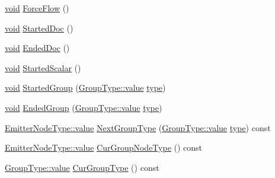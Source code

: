 \begin{DoxyCompactItemize}
\item 
\mbox{\hyperlink{glad_8h_a950fc91edb4504f62f1c577bf4727c29}{void}} \mbox{\hyperlink{class_y_a_m_l_1_1_emitter_state_ab37f1803adfbc4dc15fab899fdf5f982}{Force\+Flow}} ()
\item 
\mbox{\hyperlink{glad_8h_a950fc91edb4504f62f1c577bf4727c29}{void}} \mbox{\hyperlink{class_y_a_m_l_1_1_emitter_state_a3857bc4592ab42c96399a6a02586efbb}{Started\+Doc}} ()
\item 
\mbox{\hyperlink{glad_8h_a950fc91edb4504f62f1c577bf4727c29}{void}} \mbox{\hyperlink{class_y_a_m_l_1_1_emitter_state_a9ceddaddfdec22c12efab293248746cd}{Ended\+Doc}} ()
\item 
\mbox{\hyperlink{glad_8h_a950fc91edb4504f62f1c577bf4727c29}{void}} \mbox{\hyperlink{class_y_a_m_l_1_1_emitter_state_ace1874d4251a739c99f34ff7e0d133cc}{Started\+Scalar}} ()
\item 
\mbox{\hyperlink{glad_8h_a950fc91edb4504f62f1c577bf4727c29}{void}} \mbox{\hyperlink{class_y_a_m_l_1_1_emitter_state_a8856f8e15252abc2b1729eaccedf71cf}{Started\+Group}} (\mbox{\hyperlink{struct_y_a_m_l_1_1_group_type_aab9271cd8999a6694cb10670e6a5496f}{Group\+Type\+::value}} \mbox{\hyperlink{glad_8h_a890efa53b3d7deeeced6f3a0d6653ed3}{type}})
\item 
\mbox{\hyperlink{glad_8h_a950fc91edb4504f62f1c577bf4727c29}{void}} \mbox{\hyperlink{class_y_a_m_l_1_1_emitter_state_a9f5d053e4f87cf8633e03863b34443c9}{Ended\+Group}} (\mbox{\hyperlink{struct_y_a_m_l_1_1_group_type_aab9271cd8999a6694cb10670e6a5496f}{Group\+Type\+::value}} \mbox{\hyperlink{glad_8h_a890efa53b3d7deeeced6f3a0d6653ed3}{type}})
\item 
\mbox{\hyperlink{struct_y_a_m_l_1_1_emitter_node_type_ac42d64defd19943e78fd749faade2103}{Emitter\+Node\+Type\+::value}} \mbox{\hyperlink{class_y_a_m_l_1_1_emitter_state_a31b4f87f2f1f0b6815a232a3dc0177bb}{Next\+Group\+Type}} (\mbox{\hyperlink{struct_y_a_m_l_1_1_group_type_aab9271cd8999a6694cb10670e6a5496f}{Group\+Type\+::value}} \mbox{\hyperlink{glad_8h_a890efa53b3d7deeeced6f3a0d6653ed3}{type}}) const
\item 
\mbox{\hyperlink{struct_y_a_m_l_1_1_emitter_node_type_ac42d64defd19943e78fd749faade2103}{Emitter\+Node\+Type\+::value}} \mbox{\hyperlink{class_y_a_m_l_1_1_emitter_state_a0b8065447d34c280371e50c7a1b3d3d3}{Cur\+Group\+Node\+Type}} () const
\item 
\mbox{\hyperlink{struct_y_a_m_l_1_1_group_type_aab9271cd8999a6694cb10670e6a5496f}{Group\+Type\+::value}} \mbox{\hyperlink{class_y_a_m_l_1_1_emitter_state_a5e454e1c001f137fbbb1cc07ee7827f2}{Cur\+Group\+Type}} () const

\end{DoxyCompactItemize}
